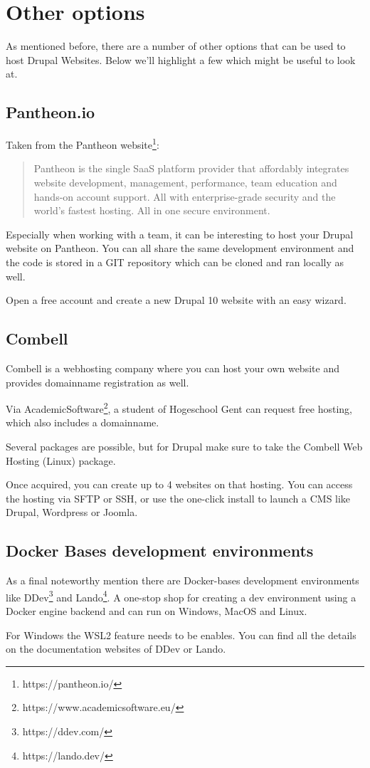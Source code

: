 \section{Other options}
As mentioned before, there are a number of other options that can be used to host Drupal Websites. Below we'll highlight a few which might be useful to look at.
\subsection{Pantheon.io}
Taken from the Pantheon website\footnote{https://pantheon.io/}:

\begin{quote}
Pantheon is the single SaaS platform provider that affordably integrates website development, management, performance, team education and hands-on account support. All with enterprise-grade security and the world's fastest hosting. All in one secure environment.
\end{quote}

Especially when working with a team, it can be interesting to host your Drupal website on Pantheon. You can all share the same development environment and the code is stored in a GIT repository which can be cloned and ran locally as well.

Open a free account and create a new Drupal 10 website with an easy wizard.

\subsection{Combell}
Combell is a webhosting company where you can host your own website and provides domainname registration as well.

Via AcademicSoftware\footnote{https://www.academicsoftware.eu/}, a student of Hogeschool Gent can request free hosting, which also includes a domainname. 

Several packages are possible, but for Drupal make sure to take the Combell Web Hosting (Linux) package. 

Once acquired, you can create up to 4 websites on that hosting. You can access the hosting via SFTP or SSH, or use the one-click install to launch a CMS like Drupal, Wordpress or Joomla.


\subsection{Docker Bases development environments}
As a final noteworthy mention there are Docker-bases development environments like DDev\footnote{https://ddev.com/} and Lando\footnote{https://lando.dev/}. A one-stop shop for creating a dev environment using a Docker engine backend and can run on Windows, MacOS and Linux.

For Windows the WSL2 feature needs to be enables. You can find all the details on the documentation websites of DDev or Lando.






